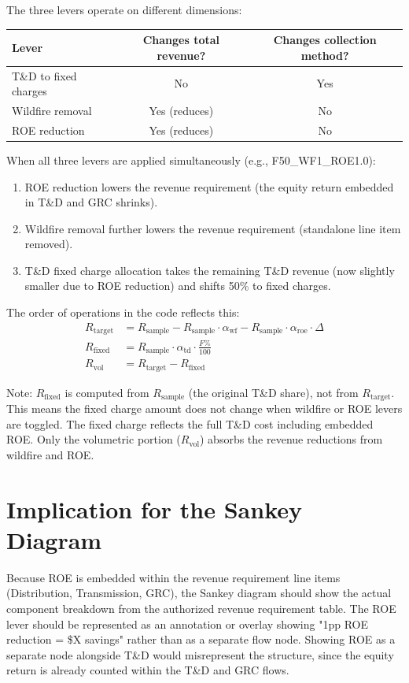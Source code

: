 \documentclass[11pt]{article}
\begin{document}
The three levers operate on different dimensions:

\begin{table}[htbp]
\centering
\begin{tabular}{l c c}
\toprule
\textbf{Lever} & \textbf{Changes total revenue?} & \textbf{Changes collection method?} \\
\midrule
T\&D to fixed charges & No & Yes \\
Wildfire removal & Yes (reduces) & No \\
ROE reduction & Yes (reduces) & No \\
\bottomrule
\end{tabular}
\end{table}

When all three levers are applied simultaneously (e.g., F50\_WF1\_ROE1.0):
\begin{enumerate}
    \item ROE reduction lowers the revenue requirement (the equity return embedded in T\&D and GRC shrinks).
    \item Wildfire removal further lowers the revenue requirement (standalone line item removed).
    \item T\&D fixed charge allocation takes the remaining T\&D revenue (now slightly smaller due to ROE reduction) and shifts 50\% to fixed charges.
\end{enumerate}

The order of operations in the code reflects this:
\begin{align}
    R_{\text{target}} &= R_{\text{sample}} - R_{\text{sample}} \cdot \alpha_{\text{wf}} - R_{\text{sample}} \cdot \alpha_{\text{roe}} \cdot \Delta \\
    R_{\text{fixed}} &= R_{\text{sample}} \cdot \alpha_{\text{td}} \cdot \frac{F\%}{100} \\
    R_{\text{vol}} &= R_{\text{target}} - R_{\text{fixed}}
\end{align}

Note: $R_{\text{fixed}}$ is computed from $R_{\text{sample}}$ (the original T\&D share), not from $R_{\text{target}}$. This means the fixed charge amount does not change when wildfire or ROE levers are toggled. The fixed charge reflects the full T\&D cost including embedded ROE. Only the volumetric portion ($R_{\text{vol}}$) absorbs the revenue reductions from wildfire and ROE.

\section{Implication for the Sankey Diagram}

Because ROE is embedded within the revenue requirement line items (Distribution, Transmission, GRC), the Sankey diagram should show the actual component breakdown from the authorized revenue requirement table. The ROE lever should be represented as an annotation or overlay showing "1pp ROE reduction = \$X savings" rather than as a separate flow node. Showing ROE as a separate node alongside T\&D would misrepresent the structure, since the equity return is already counted within the T\&D and GRC flows.
\end{document}
